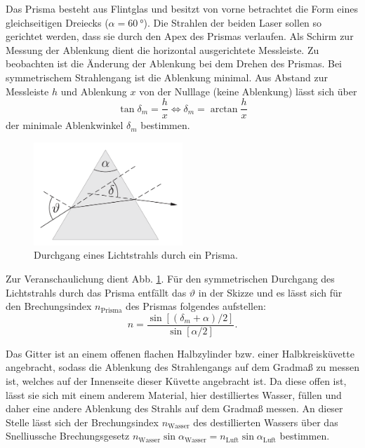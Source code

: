 			Das Prisma besteht aus Flintglas und besitzt von vorne betrachtet die Form eines gleichseitigen Dreiecks ($\alpha = \SI{60}{\degree}$).
			Die Strahlen der beiden Laser sollen so gerichtet werden, dass sie durch den Apex des Prismas verlaufen.
			Als Schirm zur Messung der Ablenkung dient die horizontal ausgerichtete Messleiste.
			Zu beobachten ist die Änderung der Ablenkung bei dem Drehen des Prismas.
			Bei symmetrischem Strahlengang ist die Ablenkung minimal.
			Aus Abstand zur Messleiste $h$ und Ablenkung $x$ von der Nulllage (keine Ablenkung) lässt sich über
			\begin{equation}
				\tan \delta_m = \frac{h}{x} \Leftrightarrow \delta_m = \arctan \frac{h}{x}
			\end{equation}
			der minimale Ablenkwinkel $\delta_m$ bestimmen.
			\begin{figure}[ht]
				\centering
				\includegraphics[width=0.5\textwidth]{bilder/prisma.png}
				\caption{Durchgang eines Lichtstrahls durch ein Prisma.\cite{WWU}}
				\label{fig:Prisma}	
			\end{figure}
			Zur Veranschaulichung dient Abb. \ref{fig:Prisma}.
			Für den symmetrischen Durchgang des Lichtstrahls durch das Prisma entfällt das $\vartheta$ in der Skizze und  es lässt sich für den Brechungsindex $n_\text{Prisma}$ des Prismas folgendes aufstellen:
			\begin{equation}
				n = \frac{\sin[(\delta_m + \alpha) / 2]}{\sin [\alpha / 2]}.
			\end{equation} 
			
			Das Gitter ist an einem offenen flachen Halbzylinder bzw. einer Halbkreisküvette angebracht, sodass die Ablenkung des Strahlengangs auf dem Gradmaß zu messen ist, welches auf der Innenseite dieser Küvette angebracht ist.
			Da diese offen ist, lässt sie sich mit einem anderem Material, hier destilliertes Wasser, füllen und daher eine andere Ablenkung des Strahls auf dem Gradmaß messen.
			An dieser Stelle lässt sich der Brechungsindex $n_\text{Wasser}$ des destillierten Wassers über das Snelliussche Brechungsgesetz $n_\text{Wasser} \sin \alpha_\text{Wasser} = n_\text{Luft} \sin \alpha_\text{Luft}$ bestimmen.
			
